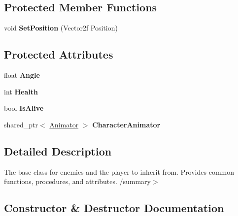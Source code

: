 \subsection*{Protected Member Functions}
\begin{DoxyCompactItemize}
\item 
\mbox{\label{class_engine_1_1_core_1_1_character_ad6e83da3df6620fedbe859022f68727f}} 
void {\bfseries Set\+Position} (Vector2f Position)
\end{DoxyCompactItemize}
\subsection*{Protected Attributes}
\begin{DoxyCompactItemize}
\item 
\mbox{\label{class_engine_1_1_core_1_1_character_ad98ac89b7c82b587306e83b5aa6acf07}} 
float {\bfseries Angle}
\item 
\mbox{\label{class_engine_1_1_core_1_1_character_a5f898cc76d7384b27f3105babb9ea27a}} 
int {\bfseries Health}
\item 
\mbox{\label{class_engine_1_1_core_1_1_character_a4b0c92ea505c26b00f1a4873bdf747b2}} 
bool {\bfseries Is\+Alive}
\item 
\mbox{\label{class_engine_1_1_core_1_1_character_a668946febda09d2a3e808a604b627fd4}} 
shared\+\_\+ptr$<$ \hyperlink{class_engine_1_1_core_1_1_animator}{Animator} $>$ {\bfseries Character\+Animator}
\end{DoxyCompactItemize}


\subsection{Detailed Description}
The base class for enemies and the player to inherit from. Provides common functions, procedures, and attributes. /summary$>$ 

\subsection{Constructor \& Destructor Documentation}
\mbox{\label{class_engine_1_1_core_1_1_character_a0377de26714b79374d0591ca44c77fd1}} 
